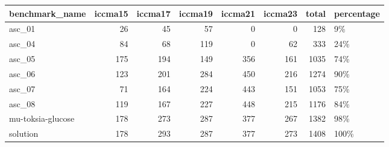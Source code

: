 \begin{tabular}{lrrrrrrl}
\toprule
benchmark\_name &  iccma15 &  iccma17 &  iccma19 &  iccma21 &  iccma23 &  total & percentage \\
\midrule
asc\_01            &       26 &       45 &       57 &        0 &        0 &    128 &         9\% \\
asc\_04            &       84 &       68 &      119 &        0 &       62 &    333 &        24\% \\
asc\_05            &      175 &      194 &      149 &      356 &      161 &   1035 &        74\% \\
asc\_06            &      123 &      201 &      284 &      450 &      216 &   1274 &        90\% \\
asc\_07            &       71 &      164 &      224 &      443 &      151 &   1053 &        75\% \\
asc\_08            &      119 &      167 &      227 &      448 &      215 &   1176 &        84\% \\
mu-toksia-glucose &      178 &      273 &      287 &      377 &      267 &   1382 &        98\% \\
solution          &      178 &      293 &      287 &      377 &      273 &   1408 &       100\% \\
\bottomrule
\end{tabular}
